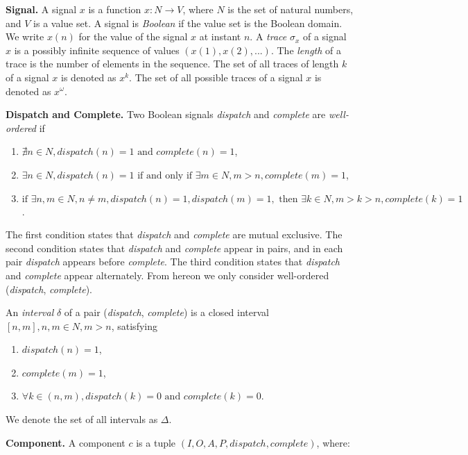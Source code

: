 {\bf Signal.}
A signal $x$ is a function $x: N \rightarrow V$, where $N$ is the set of natural numbers, and $V$ is a value set. 
A signal is \emph{Boolean} if the value set is the Boolean domain.
We write $x(n)$ for the value of the signal $x$ at instant $n$. 
A \emph{trace} $\sigma_x$ of a signal $x$ is a possibly infinite sequence of values $(x(1), x(2),... )$. 
The \emph{length} of a trace is the number of elements in the sequence. 
The set of all traces of length $k$ of a signal $x$ is denoted as $x^k$. 
The set of all possible traces of a signal $x$ is denoted as $x^{\omega}$. 

{\bf Dispatch and Complete.}
Two Boolean signals \emph{dispatch} and \emph{complete} are \emph{well-ordered} if 

\begin{enumerate}
	\item $ \nexists n\in N, dispatch(n) = 1 \text{ and } complete(n) =  1 $, 
	\item $ \exists n\in N, dispatch(n) = 1 \text{ if and only if } \exists m\in N, m > n, complete(m) =  1 $,
	\item $ \text{if } \exists n,m\in N, n \neq m, dispatch(n) = 1, dispatch(m) = 1, \text{ then } \exists k\in N, m >k> n, complete(k) = 1 $.
\end{enumerate}

The first condition states that \emph{dispatch} and \emph{complete} are mutual exclusive. The second condition states that \emph{dispatch} and \emph{complete} appear in pairs, and in each pair \emph{dispatch} appears before \emph{complete}. The third condition states that \emph{dispatch} and \emph{complete} appear alternately. 
From hereon we only consider well-ordered (\emph{dispatch}, \emph{complete}).

An \emph{interval} $\delta$ of a pair (\emph{dispatch}, \emph{complete}) is a closed interval $[n, m], n,m \in N, m>n$, satisfying

\begin{enumerate}
	\item $ dispatch(n) = 1 $, 
	\item $ complete(m) = 1 $, 
	\item $ \forall k\in (n, m), dispatch(k)=0 \text{ and } complete(k)=0 $.
\end{enumerate}

We denote the set of all intervals as $\Delta$.

{\bf Component.}
A component $c$ is a tuple $(I, O, A, P, dispatch, complete)$, where: 

